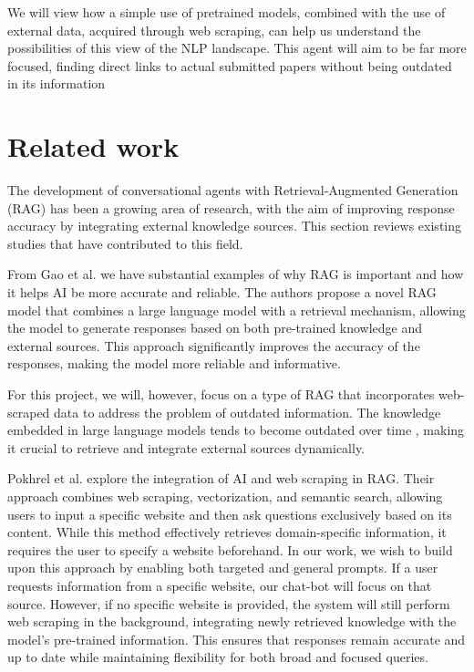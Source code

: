 \documentclass[fleqn,moreauthors,10pt]{ds_report}
\begin{document}
We will view how a simple use of pretrained models, combined with the use of external data, acquired through web scraping, can help us understand the possibilities of this view of the NLP landscape. This agent will aim to be far more focused, finding direct links to actual submitted papers without being outdated in its information
\section*{Related work}
The development of conversational agents with Retrieval-Augmented Generation (RAG) has been a growing area of research, with the aim of improving response accuracy by integrating external knowledge sources. This section reviews existing studies that have contributed to this field.

From Gao et al. \cite{gao24} we have substantial examples of why RAG is important and how it helps AI be more accurate and reliable. The authors propose a novel RAG model that combines a large language model with a retrieval mechanism, allowing the model to generate responses based on both pre-trained knowledge and external sources. This approach significantly improves the accuracy of the responses, making the model more reliable and informative.

For this project, we will, however, focus on a type of RAG that incorporates web-scraped data to address the problem of outdated information. The knowledge embedded in large language models tends to become outdated over time \cite{he2022}, making it crucial to retrieve and integrate external sources dynamically.

Pokhrel et al. \cite{Pokhrel2025} explore the integration of AI and web scraping in RAG. Their approach combines web scraping, vectorization, and semantic search, allowing users to input a specific website and then ask questions exclusively based on its content. While this method effectively retrieves domain-specific information, it requires the user to specify a website beforehand. In our work, we wish to build upon this approach by enabling both targeted and general prompts. If a user requests information from a specific website, our chat-bot will focus on that source. However, if no specific website is provided, the system will still perform web scraping in the background, integrating newly retrieved knowledge with the model’s pre-trained information. This ensures that responses remain accurate and up to date while maintaining flexibility for both broad and focused queries.
\end{document}
